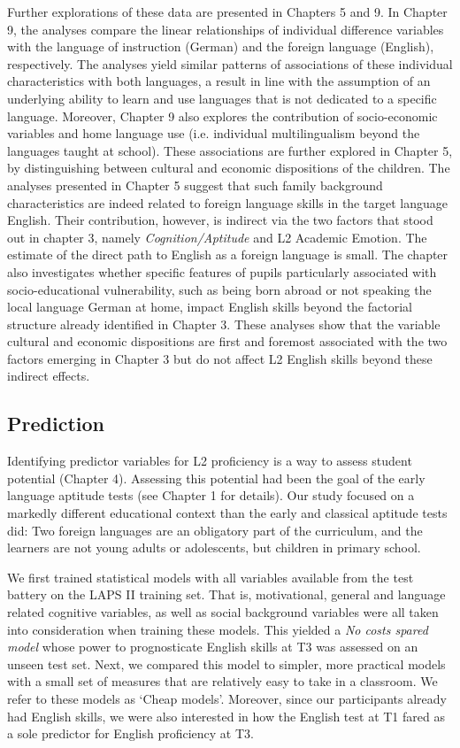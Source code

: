 \documentclass[output=paper]{langsci/langscibook}
\begin{document}
Further explorations of these data are presented in Chapters 5 and 9. In Chapter 9, the analyses compare the linear relationships of individual difference variables with the language of instruction (German) and the foreign language (English), respectively. The analyses yield similar patterns of associations of these individual characteristics with both languages, a result in line with the assumption of an underlying ability to learn and use languages that is not dedicated to a specific language. Moreover, Chapter 9 also explores the contribution of socio-economic variables and home language use (i.e. individual multilingualism beyond the languages taught at school). These associations are further explored in Chapter 5, by distinguishing between cultural and economic dispositions of the children. The analyses presented in Chapter 5 suggest that such family background characteristics are indeed related to foreign language skills in the target language English. Their contribution, however, is indirect via the two factors that stood out in chapter 3, namely \textit{Cognition/Aptitude} and L2 Academic Emotion. The estimate of the direct path to English as a foreign language is small. The chapter also investigates whether specific features of pupils particularly associated with socio-educational vulnerability, such as being born abroad or not speaking the local language German at home, impact English skills beyond the factorial structure already identified in Chapter 3. These analyses show that the variable cultural and economic dispositions are first and foremost associated with the two factors emerging in Chapter 3 but do not affect L2 English skills beyond these indirect effects.

\subsection{Prediction}

Identifying predictor variables for L2 proficiency is a way to assess student potential (Chapter 4). Assessing this potential had been the goal of the early language aptitude tests (see Chapter 1 for details). Our study focused on a markedly different educational context than the early and classical aptitude tests did: Two foreign languages are an obligatory part of the curriculum, and the learners are not young adults or adolescents, but children in primary school.

We first trained statistical models with all variables available from the test battery on the LAPS II training set. That is, motivational, general and language related cognitive variables, as well as social background variables were all taken into consideration when training these models. This yielded a \textit{No costs spared model} whose power to prognosticate English skills at T3 was assessed on an unseen test set. Next, we compared this model to simpler, more practical models with a small set of measures that are relatively easy to take in a classroom. We refer to these models as ‘Cheap models’. Moreover, since our participants already had English skills, we were also interested in how the English test at T1 fared as a sole predictor for English proficiency at T3.  
\end{document}
